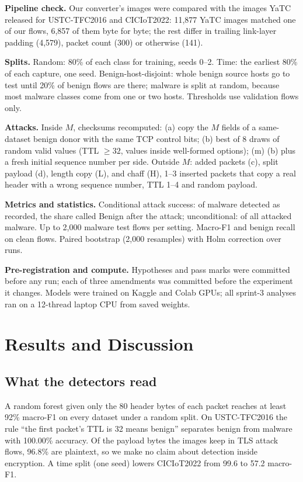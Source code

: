 \documentclass[journal]{IEEEtran}
\begin{document}


\textbf{Pipeline check.} Our converter's images were compared with the images YaTC released for USTC-TFC2016 and CICIoT2022: 11{,}877 YaTC images matched one of our flows, 6{,}857 of them byte for byte; the rest differ in trailing link-layer padding (4{,}579), packet count (300) or otherwise (141).

\textbf{Splits.} Random: 80\% of each class for training, seeds 0--2. Time: the earliest 80\% of each capture, one seed. Benign-host-disjoint: whole benign source hosts go to test until 20\% of benign flows are there; malware is split at random, because most malware classes come from one or two hosts. Thresholds use validation flows only.

\textbf{Attacks.} Inside $M$, checksums recomputed: (a) copy the $M$ fields of a same-dataset benign donor with the same TCP control bits; (b) best of 8 draws of random valid values (TTL $\geq32$, values inside well-formed options); (m) (b) plus a fresh initial sequence number per side. Outside $M$: added packets (c), split payload (d), length copy (L), and chaff (H), 1--3 inserted packets that copy a real header with a wrong sequence number, TTL 1--4 and random payload.

\textbf{Metrics and statistics.} Conditional attack success: of malware detected as recorded, the share called Benign after the attack; unconditional: of all attacked malware. Up to 2{,}000 malware test flows per setting. Macro-F1 and benign recall on clean flows. Paired bootstrap (2{,}000 resamples) with Holm correction over runs.

\textbf{Pre-registration and compute.} Hypotheses and pass marks were committed before any run; each of three amendments was committed before the experiment it changes. Models were trained on Kaggle and Colab GPUs; all sprint-3 analyses ran on a 12-thread laptop CPU from saved weights.

\section{Results and Discussion}
\label{sec:results}

\subsection{What the detectors read}
\label{sec:audit}

A random forest given only the 80 header bytes of each packet reaches at least 92\% macro-F1 on every dataset under a random split. On USTC-TFC2016 the rule ``the first packet's TTL is 32 means benign'' separates benign from malware with 100.00\% accuracy. Of the payload bytes the images keep in TLS attack flows, 96.8\% are plaintext, so we make no claim about detection inside encryption. A time split (one seed) lowers CICIoT2022 from 99.6 to 57.2 macro-F1.
\end{document}
